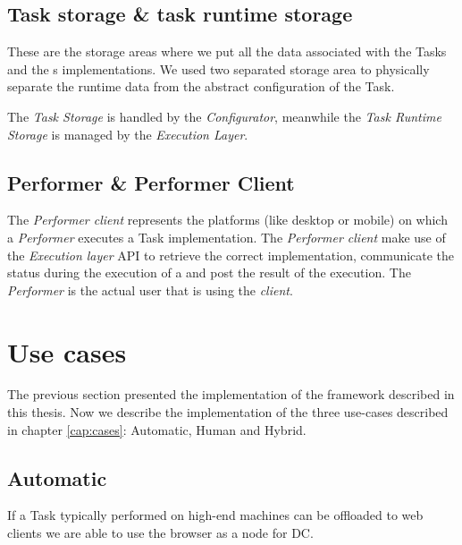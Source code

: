 \subsection{Task storage \& task runtime storage}
These are the storage areas where we put all the data associated with the Tasks
and the \utask{}s implementations. We used two separated storage area to physically
separate the runtime data from the abstract configuration of the Task.

The \emph{Task Storage} is handled by the \emph{Configurator}, meanwhile the
\emph{Task Runtime Storage} is managed by the \emph{Execution Layer}.\\



\subsection{Performer \& Performer Client}
The \emph{Performer client} represents the platforms (like desktop or mobile) on
which a \emph{Performer} executes a Task implementation. The \emph{Performer
client} make use of the \emph{Execution layer} API to retrieve the correct
implementation, communicate the status during the execution of a \utask{} and
post the result of the execution. The \emph{Performer} is the actual user that
is using the \emph{client}.






















\section{Use cases}
\label{sec:implementation:use-cases}

The previous section presented the implementation of the framework described in
this thesis. Now we describe the implementation of the three use-cases described
in chapter \ref{cap:cases}: Automatic, Human and Hybrid.

\subsection{Automatic}
If a Task typically performed on high-end machines can be offloaded to web
clients we are able to use the browser as a node for \acl{DC}.

